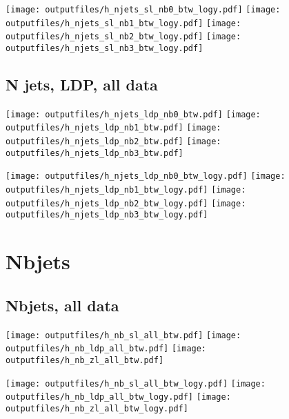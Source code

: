 \documentclass[11pt]{article}
\begin{document}
    \noindent
     \texttt{[image: outputfiles/h\_njets\_sl\_nb0\_btw\_logy.pdf]}
     \texttt{[image: outputfiles/h\_njets\_sl\_nb1\_btw\_logy.pdf]}
     \texttt{[image: outputfiles/h\_njets\_sl\_nb2\_btw\_logy.pdf]}
     \texttt{[image: outputfiles/h\_njets\_sl\_nb3\_btw\_logy.pdf]}

   \clearpage

    \subsection{ N jets, LDP, all data}

    \noindent
     \texttt{[image: outputfiles/h\_njets\_ldp\_nb0\_btw.pdf]}
     \texttt{[image: outputfiles/h\_njets\_ldp\_nb1\_btw.pdf]}
     \texttt{[image: outputfiles/h\_njets\_ldp\_nb2\_btw.pdf]}
     \texttt{[image: outputfiles/h\_njets\_ldp\_nb3\_btw.pdf]}

    \noindent
     \texttt{[image: outputfiles/h\_njets\_ldp\_nb0\_btw\_logy.pdf]}
     \texttt{[image: outputfiles/h\_njets\_ldp\_nb1\_btw\_logy.pdf]}
     \texttt{[image: outputfiles/h\_njets\_ldp\_nb2\_btw\_logy.pdf]}
     \texttt{[image: outputfiles/h\_njets\_ldp\_nb3\_btw\_logy.pdf]}

   \clearpage




    \clearpage
    \section{Nbjets}

    \subsection{ Nbjets, all data}

    \noindent
     \texttt{[image: outputfiles/h\_nb\_sl\_all\_btw.pdf]}
     \texttt{[image: outputfiles/h\_nb\_ldp\_all\_btw.pdf]}
     \texttt{[image: outputfiles/h\_nb\_zl\_all\_btw.pdf]}

    \noindent
     \texttt{[image: outputfiles/h\_nb\_sl\_all\_btw\_logy.pdf]}
     \texttt{[image: outputfiles/h\_nb\_ldp\_all\_btw\_logy.pdf]}
     \texttt{[image: outputfiles/h\_nb\_zl\_all\_btw\_logy.pdf]}
\end{document}
